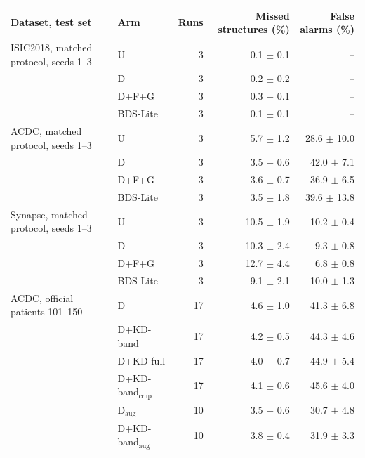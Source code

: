 \begin{tabular}{llrrr}
\toprule
Dataset, test set & Arm & Runs & Missed structures (\%) & False alarms (\%) \\
\midrule
ISIC2018, matched protocol, seeds 1--3 & U & 3 & 0.1 $\pm$ 0.1 & -- \\
 & D & 3 & 0.2 $\pm$ 0.2 & -- \\
 & D+F+G & 3 & 0.3 $\pm$ 0.1 & -- \\
 & BDS-Lite & 3 & 0.1 $\pm$ 0.1 & -- \\
\addlinespace
ACDC, matched protocol, seeds 1--3 & U & 3 & 5.7 $\pm$ 1.2 & 28.6 $\pm$ 10.0 \\
 & D & 3 & 3.5 $\pm$ 0.6 & 42.0 $\pm$ 7.1 \\
 & D+F+G & 3 & 3.6 $\pm$ 0.7 & 36.9 $\pm$ 6.5 \\
 & BDS-Lite & 3 & 3.5 $\pm$ 1.8 & 39.6 $\pm$ 13.8 \\
\addlinespace
Synapse, matched protocol, seeds 1--3 & U & 3 & 10.5 $\pm$ 1.9 & 10.2 $\pm$ 0.4 \\
 & D & 3 & 10.3 $\pm$ 2.4 & 9.3 $\pm$ 0.8 \\
 & D+F+G & 3 & 12.7 $\pm$ 4.4 & 6.8 $\pm$ 0.8 \\
 & BDS-Lite & 3 & 9.1 $\pm$ 2.1 & 10.0 $\pm$ 1.3 \\
\addlinespace
ACDC, official patients 101--150 & D & 17 & 4.6 $\pm$ 1.0 & 41.3 $\pm$ 6.8 \\
 & D+KD-band & 17 & 4.2 $\pm$ 0.5 & 44.3 $\pm$ 4.6 \\
 & D+KD-full & 17 & 4.0 $\pm$ 0.7 & 44.9 $\pm$ 5.4 \\
 & D+KD-band$_{\mathrm{cmp}}$ & 17 & 4.1 $\pm$ 0.6 & 45.6 $\pm$ 4.0 \\
 & D$_{\mathrm{aug}}$ & 10 & 3.5 $\pm$ 0.6 & 30.7 $\pm$ 4.8 \\
 & D+KD-band$_{\mathrm{aug}}$ & 10 & 3.8 $\pm$ 0.4 & 31.9 $\pm$ 3.3 \\
\bottomrule
\end{tabular}
